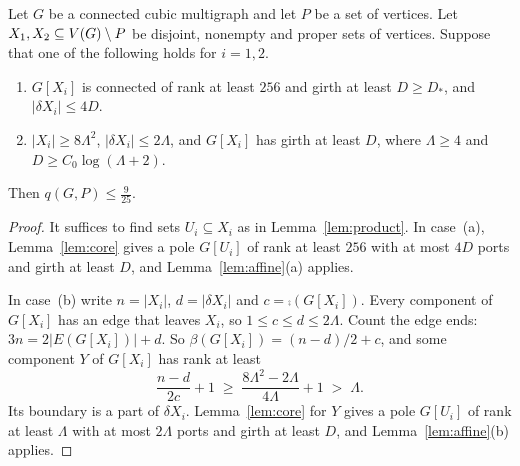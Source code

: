 \begin{proposition}\label{prop:blocks}
Let $G$ be a connected cubic multigraph and let $P$ be a set of vertices. Let
$X_1,X_2\subseteq V(G)\setminus P$ be disjoint, nonempty and proper sets of vertices. Suppose that one of
the following holds for $i=1,2$.
\begin{enumerate}
\item[\textup{(a)}] $G[X_i]$ is connected of rank at least $256$ and girth at least $D\ge D_{*}$,
and $|\delta X_i|\le4D$.
\item[\textup{(b)}] $|X_i|\ge8\Lambda^{2}$, $|\delta X_i|\le2\Lambda$, and $G[X_i]$ has girth at
least $D$, where $\Lambda\ge4$ and $D\ge C_0\log(\Lambda+2)$.
\end{enumerate}
Then $q(G,P)\le\frac9{25}$.
\end{proposition}

\begin{proof}
It suffices to find sets $U_i\subseteq X_i$ as in Lemma~\ref{lem:product}. In case~(a),
Lemma~\ref{lem:core} gives a pole $G[U_i]$ of rank at least $256$ with at most $4D$ ports and girth
at least $D$, and Lemma~\ref{lem:affine}(a) applies.

In case~(b) write $n=|X_i|$, $d=|\delta X_i|$ and $c=\comp(G[X_i])$. Every component of $G[X_i]$
has an edge that leaves $X_i$, so $1\le c\le d\le2\Lambda$. Count the edge ends:
$3n=2|E(G[X_i])|+d$. So $\beta(G[X_i])=(n-d)/2+c$, and some component $Y$ of $G[X_i]$ has rank at
least
\[
  \frac{n-d}{2c}+1\;\ge\;\frac{8\Lambda^{2}-2\Lambda}{4\Lambda}+1\;>\;\Lambda .
\]
Its boundary is a part of $\delta X_i$. Lemma~\ref{lem:core} for $Y$ gives a pole $G[U_i]$ of rank
at least $\Lambda$ with at most $2\Lambda$ ports and girth at least $D$, and
Lemma~\ref{lem:affine}(b) applies.
\end{proof}
